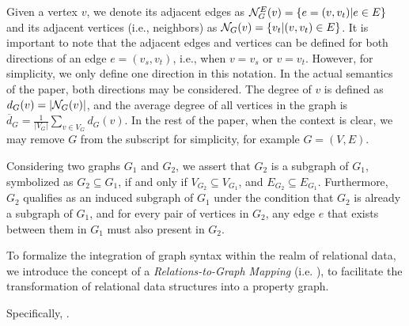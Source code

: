 Given a vertex $v$, we denote its adjacent edges as ${\mathcal{N}}_G^E(v) = \{e = (v, v_t) | e \in E\}$ and its adjacent vertices (i.e., neighbors) as ${\mathcal{N}}_G(v) = \{v_t | (v, v_t) \in E\}$. It is important to note that the adjacent edges and vertices can be defined for both directions of an edge $e = (v_s, v_t)$, i.e., when $v = v_s$ or $v = v_t$. However, for simplicity, we only define one direction in this notation. In the actual semantics of the paper, both directions may be considered. The degree of $v$ is defined as $d_G(v) = |{\mathcal{N}}_G(v)|$, and the average degree of all vertices in the graph is $\overline{d}_G = \frac{1}{|V_G|} \sum_{v \in V_G} d_G(v)$.
In the rest of the paper, when the context is clear, we may remove $G$ from the subscript for simplicity, for example $G=(V, E)$.

Considering two graphs \(G_1\) and \(G_2\), we assert that \(G_2\) is a subgraph of \(G_1\), symbolized as \(G_2 \subseteq G_1\), if and only if \(V_{G_2} \subseteq V_{G_1}\), and \(E_{G_2} \subseteq E_{G_1}\). Furthermore, \(G_2\) qualifies as an induced subgraph of \(G_1\) under the condition that \(G_2\) is already a subgraph of \(G_1\), and for every pair of vertices in \(G_2\), any edge \(e\) that exists between them in \(G_1\) must also present in \(G_2\).

To formalize the integration of graph syntax within the realm of relational data, we introduce the concept of a \textit{Relations-to-Graph Mapping} (i.e. \rgmapping), to facilitate the transformation of relational data structures into a property graph.

Specifically, .

